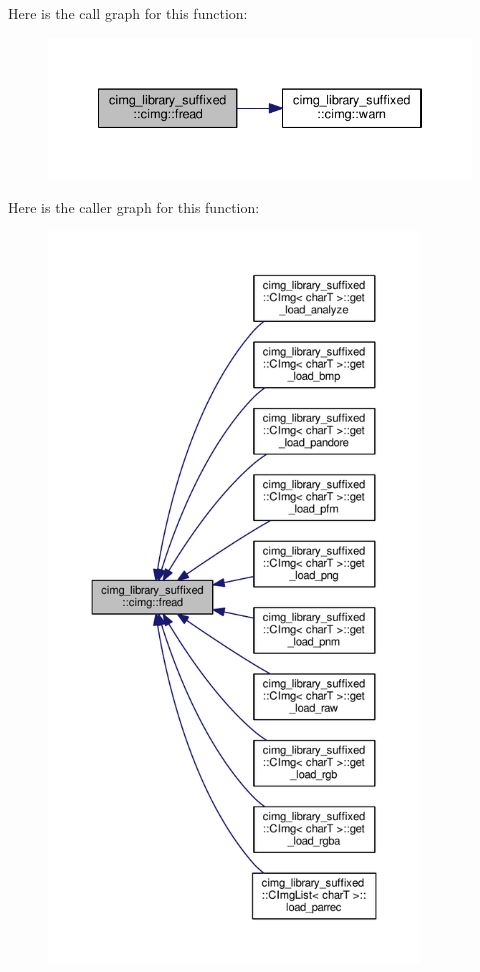 Here is the call graph for this function\+:
\nopagebreak
\begin{figure}[H]
\begin{center}
\leavevmode
\includegraphics[width=334pt]{d4/d9b/namespacecimg__library__suffixed_1_1cimg_a6b210044fcdb52b1d649ab19006de4ad_cgraph}
\end{center}
\end{figure}
Here is the caller graph for this function\+:
\nopagebreak
\begin{figure}[H]
\begin{center}
\leavevmode
\includegraphics[height=550pt]{d4/d9b/namespacecimg__library__suffixed_1_1cimg_a6b210044fcdb52b1d649ab19006de4ad_icgraph}
\end{center}
\end{figure}
\mbox{\label{namespacecimg__library__suffixed_1_1cimg_a63af61d735eb705dfeae46df8bf03184}} 
